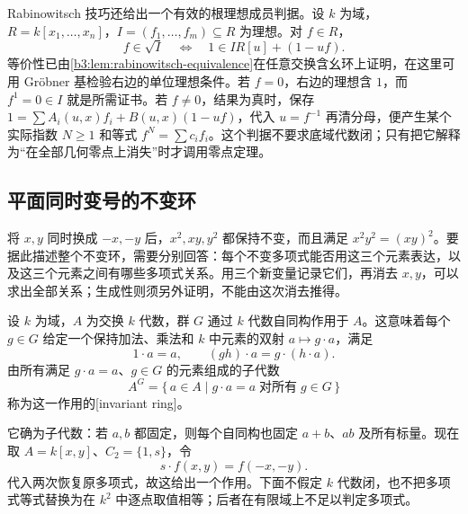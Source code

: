 \ProseParagraphBreak
Rabinowitsch 技巧还给出一个有效的根理想成员判据。设 \(k\) 为域，\(R=k[x_1,\ldots,x_n]\)，\(I=(f_1,\ldots,f_m)\subseteq R\) 为理想。对 \(f\in R\)，
\begin{equation}\label{b3:eq:effective-rabinowitsch}
	f\in\sqrt I\quad\Longleftrightarrow\quad 1\in IR[u]+(1-uf).
\end{equation}
等价性已由\cref{b3:lem:rabinowitsch-equivalence}在任意交换含幺环上证明，在这里可用 Gröbner 基检验右边的单位理想条件。若 \(f=0\)，右边的理想含 \(1\)，而 \(f^1=0\in I\) 就是所需证书。若 \(f\ne0\)，结果为真时，保存 \(1=\sum A_i(u,x)f_i+B(u,x)(1-uf)\)，代入 \(u=f^{-1}\) 再清分母，便产生某个实际指数 \(N\ge1\) 和等式 \(f^N=\sum c_i f_i\)。这个判据不要求底域代数闭；只有把它解释为“在全部几何零点上消失”时才调用零点定理。

\subsection{平面同时变号的不变环}
\label{b3:subsec:0803:sign-invariants}

将 \(x,y\) 同时换成 \(-x,-y\) 后，\(x^2,xy,y^2\) 都保持不变，而且满足 \(x^2y^2=(xy)^2\)。要据此描述整个不变环，需要分别回答：每个不变多项式能否用这三个元素表达，以及这三个元素之间有哪些多项式关系。用三个新变量记录它们，再消去 \(x,y\)，可以求出全部关系；生成性则须另外证明，不能由这次消去推得。

\begin{definition}\label{b3:def:invariant-subring}
	设 \(k\) 为域，\(A\) 为交换 \(k\) 代数，群 \(G\) 通过 \(k\) 代数自同构作用于 \(A\)。这意味着每个 \(g\in G\) 给定一个保持加法、乘法和 \(k\) 中元素的双射 \(a\mapsto g\cdot a\)，满足
	\[
		1\cdot a=a,\qquad (gh)\cdot a=g\cdot(h\cdot a).
	\]
	由所有满足 \(g\cdot a=a\)、\(g\in G\) 的元素组成的子代数
	\[
		A^G=\{\,a\in A\mid g\cdot a=a\;\text{对所有}\;g\in G\,\}
	\]
	称为这一作用的[invariant ring]。
\end{definition}

它确为子代数：若 \(a,b\) 都固定，则每个自同构也固定 \(a+b\)、\(ab\) 及所有标量。现在取 \(A=k[x,y]\)、\(C_2=\{1,s\}\)，令
\[
	s\cdot f(x,y)=f(-x,-y).
\]
代入两次恢复原多项式，故这给出一个作用。下面不假定 \(k\) 代数闭，也不把多项式等式替换为在 \(k^2\) 中逐点取值相等；后者在有限域上不足以判定多项式。

